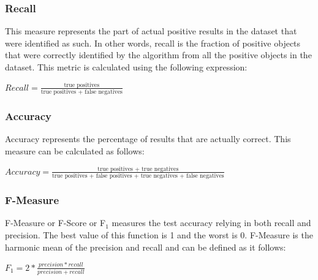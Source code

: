\subsubsection{Recall}

This measure represents the part of actual positive results in the dataset that
were identified as such. In other words, recall is the fraction of positive
objects that were correctly identified by the algorithm from all the positive objects in the
dataset. This metric is calculated using the following expression:

\begin{center}
\Large
\begin{math}
Recall = \frac{\text{true positives}}{\text{true positives + false negatives}}
\end{math}
\normalsize
\end{center}

\subsubsection{Accuracy}

Accuracy represents the percentage of results that are actually correct. This
measure can be calculated as follows:

\begin{center}
\Large
\begin{math}
Accuracy = \frac{\text{true positives + true negatives}}{\text{true positives + false positives + true negatives + false negatives}}
\end{math}
\normalsize
\end{center}


\subsubsection{F-Measure}

F-Measure or F-Score or F\begin{math}_1 \end{math} measures the test accuracy relying in both recall
and precision. The best value of this function is 1 and the worst is 0.
F-Measure is the harmonic mean of the precision and recall and can be defined as
it follows:

\begin{center}
\Large
\begin{math}
F_1 = 2 * \frac{precision*recall}{precision+recall}
\end{math}
\normalsize
\end{center}


